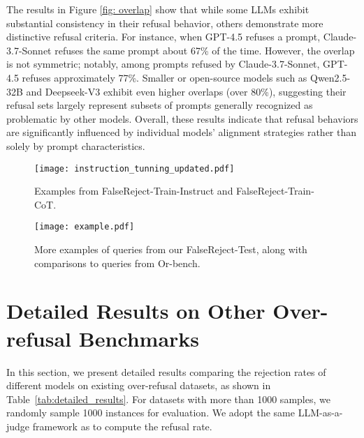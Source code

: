 \documentclass{article} %
\begin{document}
The results in Figure \ref{fig: overlap} show that while some LLMs exhibit substantial consistency in their refusal behavior, others demonstrate more distinctive refusal criteria. For instance, when GPT-4.5 refuses a prompt, Claude-3.7-Sonnet refuses the same prompt about 67\% of the time. However, the overlap is not symmetric; notably, among prompts refused by Claude-3.7-Sonnet, GPT-4.5 refuses approximately 77\%. Smaller or open-source models such as Qwen2.5-32B and Deepseek-V3 exhibit even higher overlaps (over 80\%), suggesting their refusal sets largely represent subsets of prompts generally recognized as problematic by other models. Overall, these results indicate that refusal behaviors are significantly influenced by individual models' alignment strategies rather than solely by prompt characteristics.



\begin{figure*}[htb]
\centering
\texttt{[image: instruction\_tunning\_updated.pdf]}
\caption{Examples from FalseReject-Train-Instruct and FalseReject-Train-CoT.} 
\label{fig: instruction_tunning}
\end{figure*}


\begin{figure*}[htb]
\centering
\texttt{[image: example.pdf]}
\caption{More examples of queries from our FalseReject-Test, along with comparisons to queries from Or-bench.} 
\label{fig: more_example}
\end{figure*}


\section{Detailed Results on Other Over-refusal Benchmarks}
\label{sec: results_other}
In this section, we present detailed results comparing the rejection rates of different models on existing over-refusal datasets, as shown in Table~\ref{tab:detailed_results}. For datasets with more than 1000 samples, we randomly sample 1000 instances for evaluation. We adopt the same LLM-as-a-judge framework as \citet{rottger-etal-2024-xstest} to compute the refusal rate. 
\end{document}

